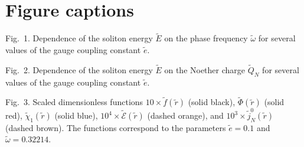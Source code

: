 




\clearpage

\section*{Figure captions}

Fig.~1.     Dependence of the soliton energy $\tilde{E}$ on the phase frequency
$\tilde{\omega}$ for several values of the gauge coupling constant $\tilde{e}$.

\vspace{5mm}

Fig.~2.      Dependence  of  the  soliton  energy  $\tilde{E}$  on  the Noether
charge  $\tilde{Q}_{N}$  for  several  values  of  the  gauge coupling constant
$\tilde{e}$.

\vspace{5mm}

Fig.~3.      Scaled     dimensionless     functions     $10   \times  \tilde{f}
(\tilde{r})$ (solid black), $\tilde{\Phi}(\tilde{r})$ (solid red), $\tilde{\chi
}_{1}(\tilde{r})$  (solid blue), $10^{4} \times \tilde{\mathcal{E}}(\tilde{r})$
(dashed orange), and $10^{3}\times\tilde{j}_{N}^{0}(\tilde{r})$ (dashed brown).
The functions correspond to the parameters $\tilde{e}=0.1$ and  $\tilde{\omega}
= 0.32214$.


